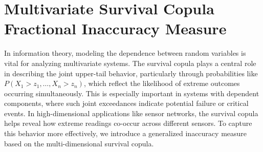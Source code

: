 \documentclass[12pt, a4paper]{article}
\numberwithin{equation}{section}
\begin{document}
\section{Multivariate Survival  Copula Fractional Inaccuracy Measure}\label{sec4}
In information theory, modeling the dependence between random variables is vital for analyzing multivariate systems. The survival copula plays a central role in describing the joint upper-tail behavior, particularly through probabilities like $P(X_1 > z_1, \ldots, X_n > z_n)$, which reflect the likelihood of extreme outcomes occurring simultaneously. This is especially important in systems with dependent components, where such joint exceedances indicate potential failure or critical events. In high-dimensional applications like sensor networks, the survival copula helps reveal how extreme readings co-occur across different sensors. To capture this behavior more effectively, we introduce a generalized inaccuracy measure based on the multi-dimensional survival copula.
\end{document}
